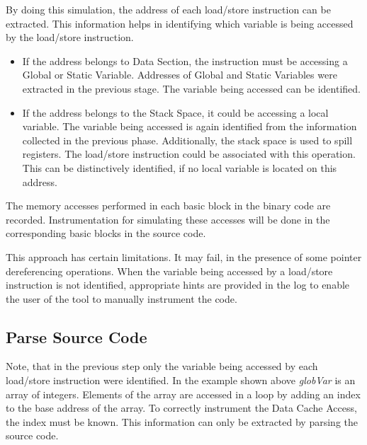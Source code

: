 By doing this simulation, the address of each load/store instruction can be extracted. This information helps in identifying which variable is being accessed by the load/store instruction. 

\begin{itemize}
\item If the address belongs to Data Section, the instruction must be accessing a Global or Static Variable. Addresses of Global and Static Variables were extracted in the previous stage. The variable being accessed can be identified. 
\item If the address belongs to the Stack Space, it could be accessing a local variable. The variable being accessed is again identified from the information collected in the previous phase. Additionally, the stack space is used to spill registers. The load/store instruction could be associated with this operation. This can be distinctively identified, if no local variable is located on this address.
\end{itemize}

The memory accesses performed in each basic block in the binary code are recorded. Instrumentation for simulating these accesses will be done in the corresponding basic blocks in the source code. 

This approach has certain limitations. It may fail, in the presence of some pointer dereferencing operations. When the variable being accessed by a load/store instruction is not identified, appropriate hints are provided in the log to enable the user of the tool to manually instrument the code.

\subsection{Parse Source Code}
Note, that in the previous step only the variable being accessed by each load/store instruction were identified. In the example shown above \emph{globVar} is an array of integers. Elements of the array are accessed in a loop by adding an index to the base address of the array. To correctly instrument the Data Cache Access, the index must be known. This information can only be extracted by parsing the source code.

